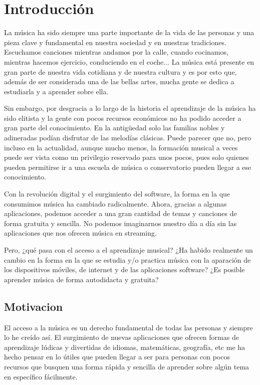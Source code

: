 \chapter{Introducción}
La música ha sido siempre una parte importante de la vida de las personas y una pieza clave y fundamental en nuestra sociedad y en nuestras tradiciones.
Escuchamos canciones mientras andamos por la calle, cuando cocinamos, mientras hacemos ejercicio, conduciendo en el coche... La música está presente en gran
parte de nuestra vida cotidiana
y de nuestra cultura y es por esto que, además de ser considerada una de las bellas artes, mucha gente se dedica a estudiarla y a aprender sobre ella.

Sin embargo, por desgracia a lo largo de la historia el aprendizaje de la música ha sido elitista y la
gente con pocos recursos económicos no ha podido acceder a gran parte del conocimiento. En la antigüedad solo
las familias nobles y adineradas podían disfrutar de las melodías clásicas. Puede parecer que no, pero incluso en la actualidad,
aunque mucho menos, la formación musical a veces puede ser vista como un privilegio reservado para unos pocos, pues solo
quienes pueden permitirse ir a una escuela de música o conservatorio pueden llegar a ese conocimiento.

Con la revolución digital y el surgimiento del software, la forma en la que consumimos música ha cambiado radicalmente.
Ahora, gracias a algunas aplicaciones, podemos acceder a una gran cantidad de temas y canciones de forma gratuita y sencilla.
No podemos imaginarnos nuestro día a día sin las aplicaciones que nos ofrecen música en streaming.

Pero, ¿qué pasa con el acceso a el aprendizaje musical? ¿Ha habido realmente un cambio en la forma en la que se estudia y/o practica música
con la aparación de los dispositivos móviles, de internet y de las aplicaciones software? ¿Es posible aprender música de forma autodidacta y
gratuita?


\section{Motivacion}
El acceso a la música es un derecho fundamental de todas las personas y siempre lo he creído así. El surgimiento de nuevas
aplicaciones que ofrecen formas de aprendizaje lúdicas y divertidas de idiomas, matemáticas, geografía, etc me ha hecho pensar
en lo útiles que pueden llegar a ser para personas con pocos recursos que busquen una forma rápida y sencilla de aprender sobre algún tema
en específico fácilmente.

